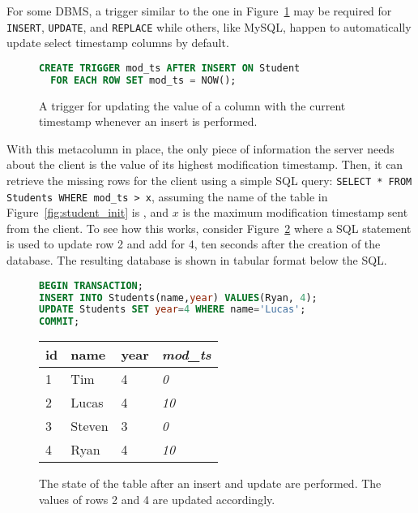 For some DBMS, a trigger similar to the one in Figure~\ref{fig:student_trigger}
may be required for \texttt{INSERT}, \texttt{UPDATE}, and \texttt{REPLACE} while
others, like MySQL, happen to automatically update select timestamp columns by
default\cite{_mysql_????-2}.

\begin{figure}[h!]
\begin{lstlisting}[language=sql]
CREATE TRIGGER mod_ts AFTER INSERT ON Student
  FOR EACH ROW SET mod_ts = NOW();
\end{lstlisting}
\caption{A trigger for updating the value of a \modts column with the current
timestamp whenever an insert is performed.}
\label{fig:student_trigger}
\end{figure}

With this metacolumn in place, the only piece of information the server needs about the
client is the value of its highest modification timestamp. Then, it can retrieve
the missing rows for the client using a simple SQL query: \texttt{SELECT * FROM
Students WHERE mod\_ts > x}, assuming the name of the table in
Figure~\ref{fig:student_init} is , and $x$ is the maximum
modification timestamp sent from the client. To see how this works, consider
Figure~\ref{fig:student_update} where a SQL statement is used to update row 2
and add for 4, ten seconds after the creation of the database. The resulting
database is shown in tabular format below the SQL.

\begin{figure}[h!]
\begin{lstlisting}[language=sql]
BEGIN TRANSACTION;
INSERT INTO Students(name,year) VALUES(Ryan, 4);
UPDATE Students SET year=4 WHERE name='Lucas';
COMMIT;
\end{lstlisting}
\center
\begin{tabular}{ l  l  l  l }
id  & name      & year  & \textit{mod\_ts} \\
\hline
1   & Tim   & 4     & \textit{0}        \\
2   & Lucas     & 4     & \textit{10}        \\
3   & Steven    & 3     & \textit{0}        \\
4   & Ryan      & 4     & \textit{10}        \\
\end{tabular}
\caption{The state of the  table after an insert and update are
performed. The \modts values of rows 2 and 4 are updated accordingly.}
\label{fig:student_update}
\end{figure}

